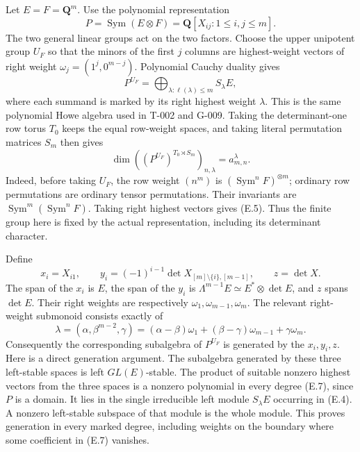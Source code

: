 \documentclass[
  10pt,
]{article}
\begin{document}
Let \(E=F=\mathbf Q^m\). Use the polynomial representation \[
P=\operatorname{Sym}(E\otimes F)=\mathbf Q[X_{ij}:1\le i,j\le m].
\] The two general linear groups act on the two factors. Choose the
upper unipotent group \(U_F\) so that the minors of the first \(j\)
columns are highest-weight vectors of right weight
\(\omega_j=(1^j,0^{m-j})\). Polynomial Cauchy duality gives \[
P^{U_F}=\bigoplus_{\lambda:\ell(\lambda)\le m} S_\lambda E,
\tag{E.4}
\] where each summand is marked by its right highest weight \(\lambda\).
This is the same polynomial Howe algebra used in T-002 and G-009. Taking
the determinant-one row torus \(T_0\) keeps the equal row-weight spaces,
and taking literal permutation matrices \(S_m\) then gives \[
\dim ((P^{U_F})^{T_0\rtimes S_m})_{n,\lambda}
=a_{m,n}^{\lambda}.
\tag{E.5}
\] Indeed, before taking \(U_F\), the row weight \((n^m)\) is
\((\operatorname{Sym}^nF)^{\otimes m}\); ordinary row permutations are
ordinary tensor permutations. Their invariants are
\(\operatorname{Sym}^m(\operatorname{Sym}^nF)\). Taking right highest
vectors gives (E.5). Thus the finite group here is fixed by the actual
representation, including its determinant character.

Define \[
x_i=X_{i1},\qquad
y_i=(-1)^{i-1}\det X_{[m]\setminus\{i\},[m-1]},\qquad
z=\det X.
\tag{E.6}
\] The span of the \(x_i\) is \(E\), the span of the \(y_i\) is
\(\Lambda^{m-1}E\simeq E^*\otimes\det E\), and \(z\) spans \(\det E\).
Their right weights are respectively \(\omega_1,\omega_{m-1},\omega_m\).
The relevant right-weight submonoid consists exactly of \[
\lambda=(\alpha,\beta^{m-2},\gamma)
=(\alpha-\beta)\omega_1+(\beta-\gamma)\omega_{m-1}+\gamma\omega_m.
\tag{E.7}
\] Consequently the corresponding subalgebra of \(P^{U_F}\) is generated
by the \(x_i,y_i,z\). Here is a direct generation argument. The
subalgebra generated by these three left-stable spaces is left
\(GL(E)\)-stable. The product of suitable nonzero highest vectors from
the three spaces is a nonzero polynomial in every degree (E.7), since
\(P\) is a domain. It lies in the single irreducible left module
\(S_\lambda E\) occurring in (E.4). A nonzero left-stable subspace of
that module is the whole module. This proves generation in every marked
degree, including weights on the boundary where some coefficient in
(E.7) vanishes.
\end{document}
